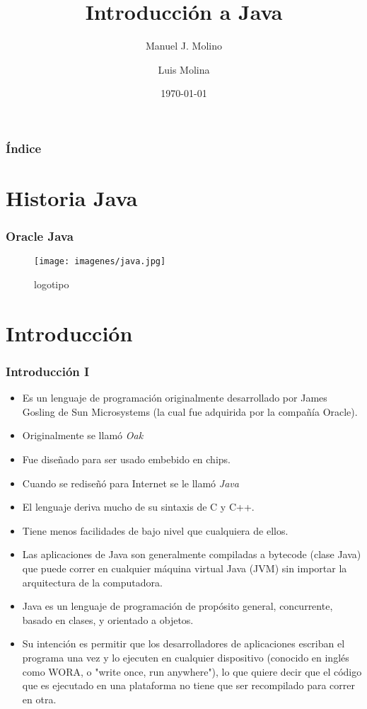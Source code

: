 \documentclass{beamer}
\title{Introducción a Java}
\author{Manuel J. Molino\and Luis Molina}
\institute{IES Virgen del Carmen\and Departamento de informatica}
\date{\today}
\begin{document}
\begin{frame}
\titlepage %
\end{frame} 

\begin{frame}
\frametitle{Índice}
\tableofcontents
\end{frame} 


\section{Historia Java} 

\begin{frame}
\frametitle{Oracle Java} 
\begin{figure}
\texttt{[image: imagenes/java.jpg]} 
\caption{logotipo}
\end{figure} 
\end{frame}

\section{Introducción}

\begin{frame}
\frametitle{Introducción I}
\begin{small}
\begin{itemize}[<+->]
\item Es un lenguaje de programación originalmente desarrollado por James Gosling de Sun Microsystems (la cual fue adquirida por la compañía Oracle).
\item Originalmente se llamó \emph{Oak}
\item Fue diseñado para ser usado embebido en chips.
\item Cuando se rediseñó para Internet se le llamó \emph{Java}
\item El lenguaje deriva mucho de su sintaxis de C y C++.
\item Tiene menos facilidades de bajo nivel que cualquiera de ellos.
\item Las aplicaciones de Java son generalmente compiladas a bytecode (clase Java) que puede correr en cualquier máquina virtual Java (JVM) sin importar la arquitectura de la computadora.
\item Java es un lenguaje de programación de propósito general, concurrente, basado en clases, y orientado a objetos.
\item Su intención es permitir que los desarrolladores de aplicaciones escriban el programa una vez y lo ejecuten en cualquier dispositivo (conocido en inglés como WORA, o "write once, run anywhere"), lo que quiere decir que el código que es ejecutado en una plataforma no tiene que ser recompilado para correr en otra.
\end{itemize} 
\end{small}
\end{frame}
\end{document}

